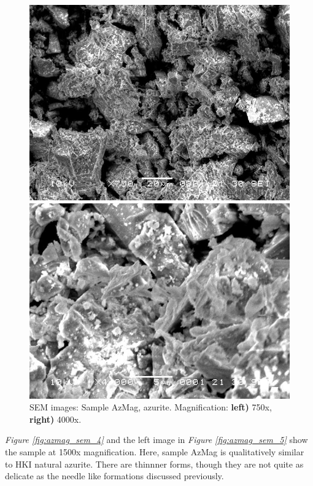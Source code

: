 \begin{figure}[H]
\centering
\begin{minipage}{.45\textwidth}
  \centering
  \includegraphics[width=\linewidth]{AzMag_x750_3_160321}
\end{minipage}
\begin{minipage}{.45\textwidth}
  \centering
  \includegraphics[width=\linewidth]{AzMag_x4000_1_160321}
\end{minipage}
\caption[SEM images: Sample AzMag, azurite]{SEM images: Sample AzMag, azurite. Magnification: \textbf{left)} 750x, \textbf{right)} 4000x.}
\label{fig:azmag_sem_3}
\end{figure}

\textit{Figure \ref{fig:azmag_sem_4}} and the left image in \textit{Figure \ref{fig:azmag_sem_5}} show the sample at 1500x magnification. Here, sample AzMag is qualitatively similar to HKI natural azurite. There are thinnner forms, though they are not quite as delicate as the needle like formations discussed previously.


